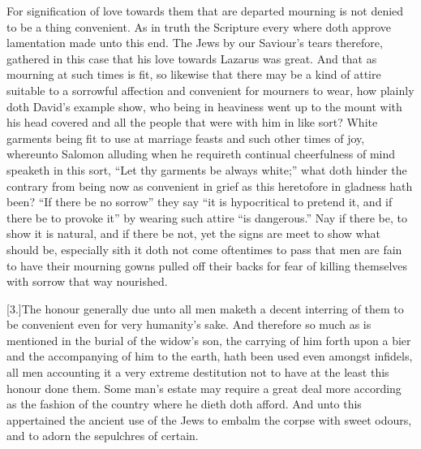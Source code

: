 For signification of love towards them that are departed mourning is not denied to be a thing convenient. As in truth the Scripture every where doth approve lamentation made unto this end. The Jews by our Saviour’s tears therefore, gathered in this case that his love towards Lazarus was great.  And that as mourning at such times is fit,
 so likewise that there may be a kind of attire suitable to a sorrowful affection and convenient for mourners to wear, how plainly doth David’s example show, who being in heaviness went up to the mount with his head covered and all the people that were with him in like sort? White garments being fit to use at marriage feasts and such other times of joy, whereunto Salomon alluding when he requireth continual cheerfulness of mind speaketh in this sort, “Let thy garments be always white;” what doth hinder the contrary from being now as convenient in grief as this heretofore in gladness hath been? “If there be no sorrow” they say “it is hypocritical to pretend it, and if there be to provoke it” by wearing such attire “is dangerous.” Nay if there be, to show it is natural, and if there be not, yet the signs are meet to show what should be, especially sith it doth not come oftentimes to pass that men are fain to have their mourning gowns pulled off their backs for fear of killing themselves with sorrow that way nourished.



[3.]The honour generally due unto all men maketh a decent interring of them to be convenient even for very humanity’s sake.
 And therefore so much as is mentioned in the burial of the widow’s son, the carrying of him forth upon a bier and the accompanying of him to the earth, hath been used even amongst infidels, all men accounting it a very extreme destitution not to have at the least this honour done them. Some man’s estate may require a great deal more according as the fashion of the country where he dieth doth afford. And unto this appertained the ancient use of the Jews to embalm the corpse with sweet odours, and to adorn the sepulchres of certain.

